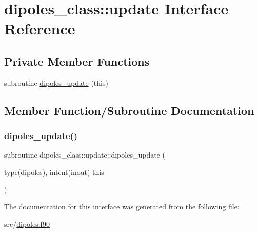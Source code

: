 \hypertarget{interfacedipoles__class_1_1update}{}\section{dipoles\+\_\+class\+:\+:update Interface Reference}
\label{interfacedipoles__class_1_1update}
\subsection*{Private Member Functions}
\begin{DoxyCompactItemize}
\item 
subroutine \hyperlink{interfacedipoles__class_1_1update_a72207a666ec6cdad508cafbf4969d037}{dipoles\+\_\+update} (this)
\end{DoxyCompactItemize}


\subsection{Member Function/\+Subroutine Documentation}
\mbox{\label{interfacedipoles__class_1_1update_a72207a666ec6cdad508cafbf4969d037}} 
\subsubsection{\texorpdfstring{dipoles\+\_\+update()}{dipoles\_update()}}
{\footnotesize\ttfamily subroutine dipoles\+\_\+class\+::update\+::dipoles\+\_\+update (\begin{DoxyParamCaption}\item[{type(\hyperlink{structdipoles__class_1_1dipoles}{dipoles}), intent(inout)}]{this }\end{DoxyParamCaption})\hspace{0.3cm}{\ttfamily [private]}}



The documentation for this interface was generated from the following file\+:\begin{DoxyCompactItemize}
\item 
src/\hyperlink{dipoles_8f90}{dipoles.\+f90}\end{DoxyCompactItemize}
